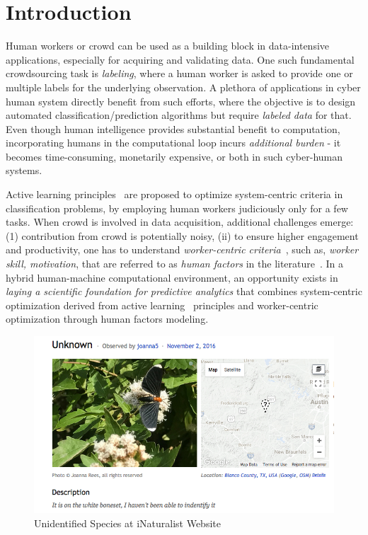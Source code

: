 \vspace{-0.2in}
\section{Introduction}\label{intro}

\vspace{-0.1in}


 Human workers or crowd can  be  used  as  a  building  block  in data-intensive applications, especially for acquiring and  validating data. One such fundamental crowdsourcing task is {\em labeling}, where a human worker is asked to provide one or multiple labels for the underlying observation. A plethora of applications in cyber human system directly benefit from such efforts, where the objective is to design automated classification/prediction algorithms but require {\em labeled data} for that. Even though human intelligence provides substantial benefit to computation, incorporating humans in the computational loop incurs {\em additional burden} - it becomes time-consuming, monetarily expensive, or both in such cyber-human systems. 
 
Active learning principles~\cite{al1,al2} are proposed to optimize system-centric criteria in classification problems, by employing human workers judiciously only for a few tasks. When crowd is involved in data acquisition, additional challenges emerge: (1) contribution from crowd is potentially noisy, (ii) to ensure  higher engagement and productivity, one has to understand {\em worker-centric criteria}~\cite{martin2014being}, such as, {\em worker skill, motivation}, that are referred to as {\em human factors} in the literature~\cite{amer2016human,hf1,motiv1,motiv2}. In a hybrid human-machine computational environment, an opportunity exists in {\em laying a scientific foundation for predictive analytics} that combines system-centric optimization derived from active learning~\cite{al1,al2} principles and worker-centric optimization through human factors modeling. 

\begin{figure}
\centering
\includegraphics[scale=0.3]{submissions/senjuti/figures/unknown.png}
\caption{\label{fig:unknown} \small Unidentified Species at iNaturalist Website}
\end{figure} 

